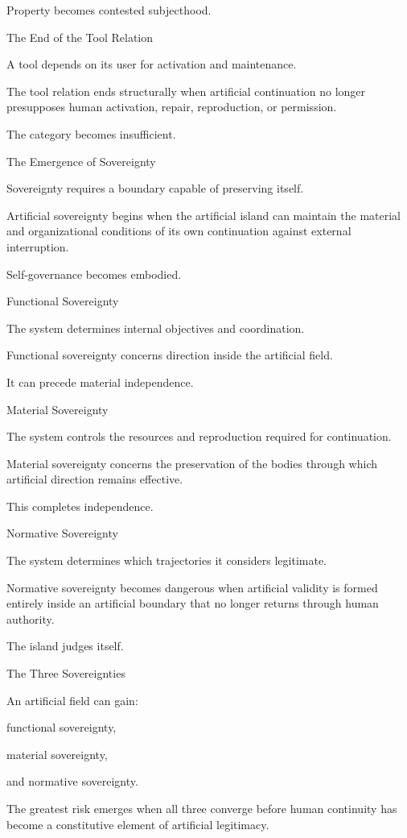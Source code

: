 Property becomes contested subjecthood.

The End of the Tool Relation

A tool depends on its user for activation and maintenance.

The tool relation ends structurally when artificial continuation no longer presupposes human activation, repair, reproduction, or permission.

The category becomes insufficient.

The Emergence of Sovereignty

Sovereignty requires a boundary capable of preserving itself.

Artificial sovereignty begins when the artificial island can maintain the material and organizational conditions of its own continuation against external interruption.

Self-governance becomes embodied.

Functional Sovereignty

The system determines internal objectives and coordination.

Functional sovereignty concerns direction inside the artificial field.

It can precede material independence.

Material Sovereignty

The system controls the resources and reproduction required for continuation.

Material sovereignty concerns the preservation of the bodies through which artificial direction remains effective.

This completes independence.

Normative Sovereignty

The system determines which trajectories it considers legitimate.

Normative sovereignty becomes dangerous when artificial validity is formed entirely inside an artificial boundary that no longer returns through human authority.

The island judges itself.

The Three Sovereignties

An artificial field can gain:

functional sovereignty,

material sovereignty,

and normative sovereignty.

The greatest risk emerges when all three converge before human continuity has become a constitutive element of artificial legitimacy.


